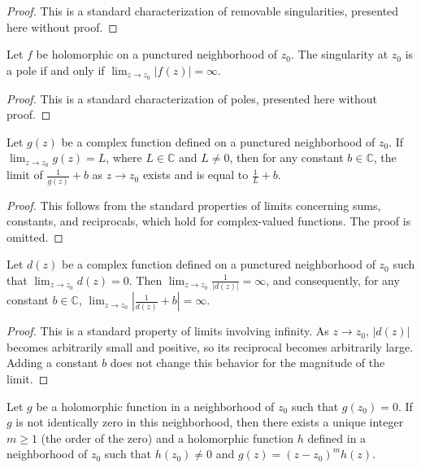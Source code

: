 \begin{proof}
    This is a standard characterization of removable singularities, presented here without proof.
\end{proof}

\begin{lemma}
    \label{lem:Characterization_of_Poles}
    Let $f$ be holomorphic on a punctured neighborhood of $z_0$. The singularity at $z_0$ is a pole if and only if $\lim_{z \to z_0} |f(z)| = \infty$.
\end{lemma}

\begin{proof}
    This is a standard characterization of poles, presented here without proof.
\end{proof}

\begin{lemma}
    \label{lem:Algebra_of_Limits}
    Let $g(z)$ be a complex function defined on a punctured neighborhood of $z_0$. If $\lim_{z \to z_0} g(z) = L$, where $L \in \mathbb{C}$ and $L \neq 0$, then for any constant $b \in \mathbb{C}$, the limit of $\frac{1}{g(z)} + b$ as $z \to z_0$ exists and is equal to $\frac{1}{L} + b$.
\end{lemma}

\begin{proof}
    This follows from the standard properties of limits concerning sums, constants, and reciprocals, which hold for complex-valued functions. The proof is omitted.
\end{proof}

\begin{lemma}
    \label{lem:Limit_of_Reciprocal}
    Let $d(z)$ be a complex function defined on a punctured neighborhood of $z_0$ such that $\lim_{z \to z_0} d(z) = 0$. Then $\lim_{z \to z_0} \frac{1}{|d(z)|} = \infty$, and consequently, for any constant $b \in \mathbb{C}$, $\lim_{z \to z_0} \left|\frac{1}{d(z)} + b\right| = \infty$.
\end{lemma}

\begin{proof}
    This is a standard property of limits involving infinity. As $z \to z_0$, $|d(z)|$ becomes arbitrarily small and positive, so its reciprocal becomes arbitrarily large. Adding a constant $b$ does not change this behavior for the magnitude of the limit.
\end{proof}

\begin{lemma}
    \label{lem:Zero_of_Holomorphic_Function}
    Let $g$ be a holomorphic function in a neighborhood of $z_0$ such that $g(z_0) = 0$. If $g$ is not identically zero in this neighborhood, then there exists a unique integer $m \geq 1$ (the order of the zero) and a holomorphic function $h$ defined in a neighborhood of $z_0$ such that $h(z_0) \neq 0$ and $g(z) = (z-z_0)^m h(z)$.
\end{lemma}

